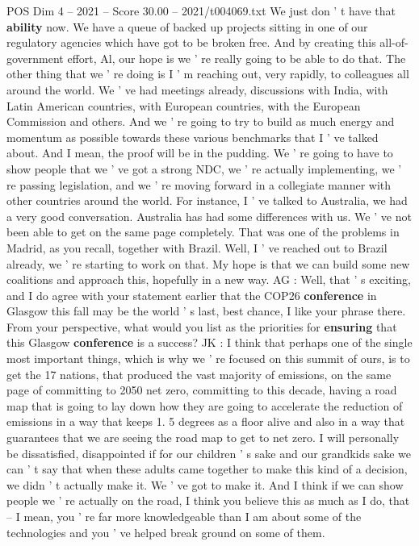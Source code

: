 \begin{textsample}{POS Dim 4 – 2021 – Score 30.00 – 2021/t004069.txt}
We just don ' t have that \textbf{ability} now.
We have a queue of backed up projects sitting in one of our regulatory agencies which have got to be broken free.
And by creating this all-of-government effort, Al, our hope is we ' re really going to be able to do that.
The other thing that we ' re doing is I ' m reaching out, very rapidly, to colleagues all around the world.
We ' ve had meetings already, discussions with India, with Latin American countries, with European countries, with the European Commission and others.
And we ' re going to try to build as much energy and momentum as possible towards these various benchmarks that I ' ve talked about.
And I mean, the proof will be in the pudding.
We ' re going to have to show people that we ' ve got a strong NDC, we ' re actually implementing, we ' re passing legislation, and we ' re moving forward in a collegiate manner with other countries around the world.
For instance, I ' ve talked to Australia, we had a very good conversation.
Australia has had some differences with us.
We ' ve not been able to get on the same page completely.
That was one of the problems in Madrid, as you recall, together with Brazil.
Well, I ' ve reached out to Brazil already, we ' re starting to work on that.
My hope is that we can build some new coalitions and approach this, hopefully in a new way.
AG : Well, that ' s exciting, and I do agree with your statement earlier that the COP26 \textbf{conference} in Glasgow this fall may be the world ' s last, best chance, I like your phrase there.
From your perspective, what would you list as the priorities for \textbf{ensuring} that this Glasgow \textbf{conference} is a success?
JK : I think that perhaps one of the single most important things, which is why we ' re focused on this summit of ours, is to get the 17 nations, that produced the vast majority of emissions, on the same page of committing to 2050 net zero, committing to this decade, having a road map that is going to lay down how they are going to accelerate the reduction of emissions in a way that keeps 1. 5 degrees as a floor alive and also in a way that guarantees that we are seeing the road map to get to net zero.
I will personally be dissatisfied, disappointed if for our children ' s sake and our grandkids sake we can ' t say that when these adults came together to make this kind of a decision, we didn ' t actually make it.
We ' ve got to make it.
And I think if we can show people we ' re actually on the road, I think you believe this as much as I do, that -- I mean, you ' re far more knowledgeable than I am about some of the technologies and you ' ve helped break ground on some of them.

\end{textsample}

